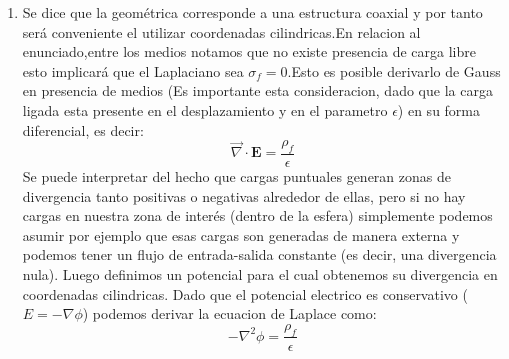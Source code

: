 \documentclass[
  11pt,
  letterpaper,
   addpoints,
   answers
  ]{exam}
\begin{document}
\begin{questions}
\begin{center}
    \end{center}
    \begin{solution}
        \begin{enumerate}
            \item Se dice que la geométrica corresponde a una estructura coaxial y por tanto será conveniente el utilizar coordenadas cilindricas.En relacion al enunciado,entre los medios notamos que no existe presencia de carga libre esto implicará que el Laplaciano sea $\sigma_f = 0$.Esto es posible derivarlo de Gauss en presencia de medios (Es importante esta consideracion, dado que la carga ligada esta presente en el desplazamiento y en el parametro $\epsilon$) en su forma  diferencial, es decir:
            \begin{equation}
                \Vec{\nabla} \cdot \textbf{E} = \frac{\rho_f}{\epsilon} 
            \end{equation}
            Se puede interpretar del hecho que cargas puntuales generan zonas de divergencia tanto positivas o negativas alrededor de ellas, pero si no hay cargas en nuestra zona de interés (dentro de la esfera) simplemente podemos asumir por ejemplo que esas cargas son generadas de manera externa y podemos tener un flujo de entrada-salida constante (es decir, una divergencia nula). Luego definimos un potencial para el cual obtenemos su divergencia en coordenadas cilindricas. Dado que el potencial electrico es conservativo ($E = - \nabla \phi$) podemos derivar la ecuacion de Laplace como:
            \begin{equation}
                -\nabla^{2}\phi = \frac{\rho_f}{\epsilon}
            \end{equation}

\end{enumerate}
\end{solution}
\end{questions}
\end{document}
